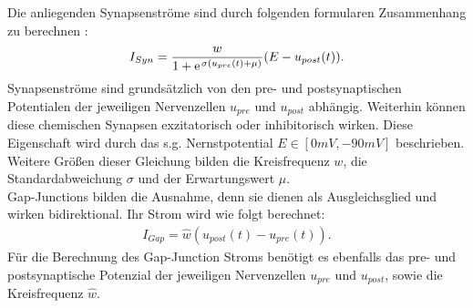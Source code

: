 	Die anliegenden Synapsenströme sind durch folgenden formularen Zusammenhang zu berechnen \cite{WormLevelRL}:
	\begin{align}
		\label{eq:chem_syn_current}
		I_{Syn} = \frac{w}{1 + \e^{\sigma(u_{pre}(t) + \mu)}}(E - u_{post}(t))\text{.}
	\end{align}
	Synapsenströme sind grundsätzlich von den pre- und postsynaptischen Potentialen der jeweiligen Nervenzellen $u_{pre}$ und $u_{post}$ abhängig. Weiterhin können diese chemischen Synapsen exzitatorisch oder inhibitorisch wirken. Diese Eigenschaft wird durch das s.g. Nernstpotential $E\in[0mV, -90mV]$ beschrieben. Weitere Größen dieser Gleichung bilden die Kreisfrequenz $w$, die Standardabweichung $\sigma$ und der Erwartungswert $\mu$.\\
	Gap-Junctions bilden die Ausnahme, denn sie dienen als Ausgleichsglied und wirken bidirektional. Ihr Strom wird wie folgt berechnet:
	\begin{align}
		\label{eq:gap_syn_current}
		I_{Gap} = \hat{w}(u_{post}(t) - u_{pre}(t))\text{.}
	\end{align}
	Für die Berechnung des Gap-Junction Stroms benötigt es ebenfalls das pre- und postsynaptische Potenzial der jeweiligen Nervenzellen $u_{pre}$ und $u_{post}$, sowie die Kreisfrequenz $\hat{w}$.
	
